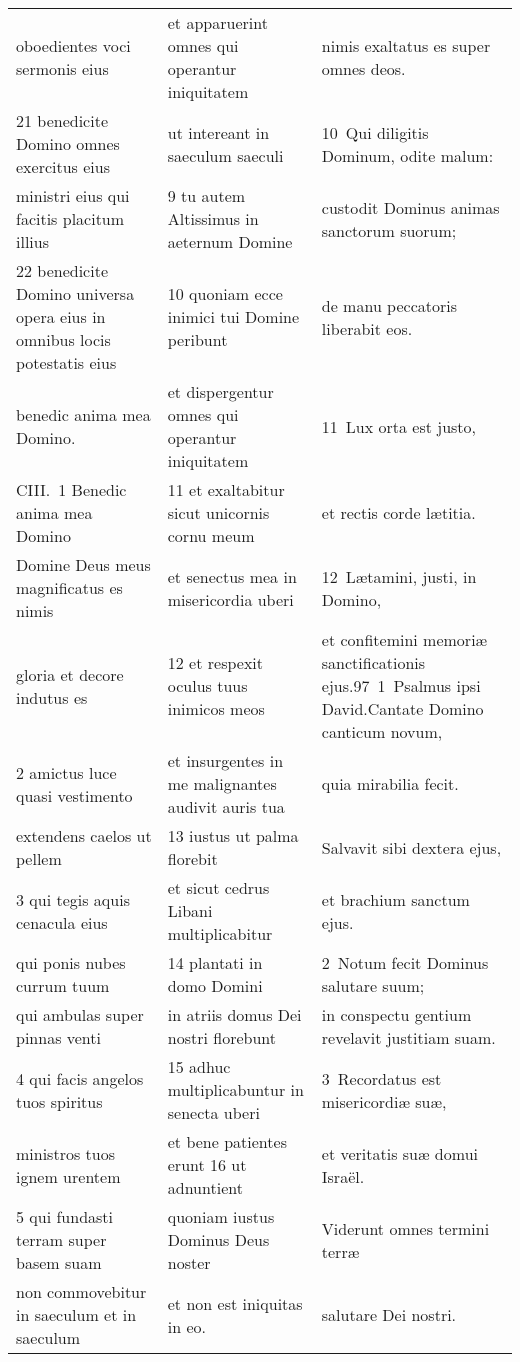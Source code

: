 \documentclass{article}
\begin{document}
\begin{longtable}{@{}p{}p{}p{}@{}}
oboedientes voci sermonis eius	&	et apparuerint omnes qui operantur iniquitatem	&	nimis exaltatus es super omnes deos.	\\
21 benedicite Domino omnes exercitus eius	&	ut intereant in saeculum saeculi	&	10 Qui diligitis Dominum, odite malum:	\\
ministri eius qui facitis placitum illius	&	9 tu autem Altissimus in aeternum Domine	&	custodit Dominus animas sanctorum suorum;	\\
22 benedicite Domino universa opera eius in omnibus locis potestatis eius	&	10 quoniam ecce inimici tui Domine peribunt	&	de manu peccatoris liberabit eos.	\\
benedic anima mea Domino.	&	et dispergentur omnes qui operantur iniquitatem	&	11 Lux orta est justo,	\\
CIII. 1 Benedic anima mea Domino	&	11 et exaltabitur sicut unicornis cornu meum	&	et rectis corde lætitia.	\\
Domine Deus meus magnificatus es nimis	&	et senectus mea in misericordia uberi	&	12 Lætamini, justi, in Domino,	\\
gloria et decore indutus es	&	12 et respexit oculus tuus inimicos meos	&	et confitemini memoriæ sanctificationis ejus.97 1 Psalmus ipsi David.Cantate Domino canticum novum,	\\
2 amictus luce quasi vestimento	&	et insurgentes in me malignantes audivit auris tua	&	quia mirabilia fecit.	\\
extendens caelos ut pellem	&	13 iustus ut palma florebit	&	Salvavit sibi dextera ejus,	\\
3 qui tegis aquis cenacula eius	&	et sicut cedrus Libani multiplicabitur	&	et brachium sanctum ejus.	\\
qui ponis nubes currum tuum	&	14 plantati in domo Domini	&	2 Notum fecit Dominus salutare suum;	\\
qui ambulas super pinnas venti	&	in atriis domus Dei nostri florebunt	&	in conspectu gentium revelavit justitiam suam.	\\
4 qui facis angelos tuos spiritus	&	15 adhuc multiplicabuntur in senecta uberi	&	3 Recordatus est misericordiæ suæ,	\\
ministros tuos ignem urentem	&	et bene patientes erunt 16 ut adnuntient	&	et veritatis suæ domui Israël.	\\
5 qui fundasti terram super basem suam	&	quoniam iustus Dominus Deus noster	&	Viderunt omnes termini terræ	\\
non commovebitur in saeculum et in saeculum	&	et non est iniquitas in eo.	&	salutare Dei nostri.	\\

\end{longtable}
\end{document}
